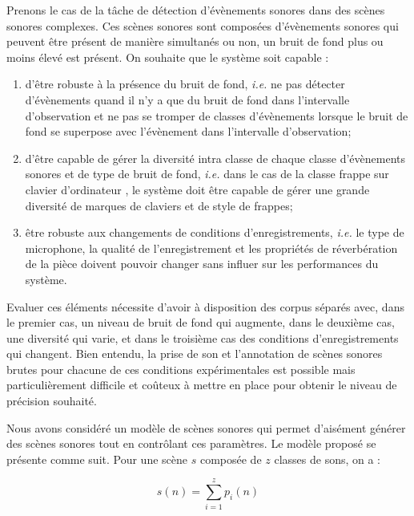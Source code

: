   Prenons le cas de la tâche de détection d'évènements sonores dans des scènes sonores complexes. Ces scènes sonores sont composées d'évènements sonores qui peuvent être présent de manière simultanés ou non, un bruit de fond plus ou moins élevé est présent. On souhaite que le système soit capable :
  \begin{enumerate}
    \item d'être robuste à la présence du bruit de fond, \textit{i.e.} ne pas détecter d'évènements quand il n'y a que du bruit de fond dans l'intervalle d'observation et ne pas se tromper de classes d'évènements lorsque le bruit de fond se superpose avec l'évènement  dans l'intervalle d'observation;
    \item d'être capable de gérer la diversité intra classe de chaque classe d'évènements sonores et de type de bruit de fond,  \textit{i.e.} dans le cas de la classe \og frappe sur clavier d'ordinateur \fg, le système doit être capable de gérer une grande diversité de marques de claviers et de style de frappes;
    \item être robuste aux changements de conditions d'enregistrements,  \textit{i.e.} le type de microphone, la qualité de l'enregistrement et les propriétés de réverbération de la pièce doivent pouvoir changer sans influer sur les performances du système.
  \end{enumerate}

  Evaluer ces éléments nécessite d'avoir à disposition des corpus séparés avec, dans le premier cas, un niveau de bruit de fond qui augmente, dans le deuxième cas, une diversité qui varie, et dans le troisième cas des conditions d'enregistrements qui changent. Bien entendu, la prise de son et l'annotation de scènes sonores brutes pour chacune de ces conditions expérimentales est possible mais particulièrement difficile et coûteux à mettre en place pour obtenir le niveau de précision souhaité.

  Nous avons considéré un modèle de scènes sonores qui permet d'aisément générer des scènes sonores tout en contrôlant ces paramètres. Le modèle proposé se présente comme suit. Pour une scène $s$ composée de $z$ classes de sons, on a :

  \begin{equation}
    s(n)=\sum_{i=1}^{z}p_i(n)
  \end{equation}

